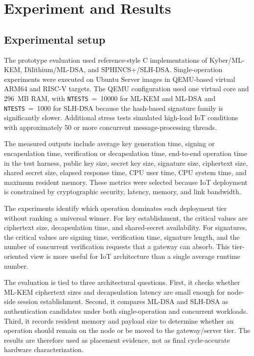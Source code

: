 \documentclass[conference,10pt,letterpaper]{IEEEtran}
\begin{document}
\section{Experiment and Results}

\subsection{Experimental setup}

The prototype evaluation used reference-style C implementations of Kyber/ML-KEM, Dilithium/ML-DSA, and SPHINCS+/SLH-DSA. Single-operation experiments were executed on Ubuntu Server images in QEMU-based virtual ARM64 and RISC-V targets. The QEMU configuration used one virtual core and 296~MB RAM, with \texttt{NTESTS}~=~10000 for ML-KEM and ML-DSA and \texttt{NTESTS}~=~1000 for SLH-DSA because the hash-based signature family is significantly slower. Additional stress tests simulated high-load IoT conditions with approximately 50 or more concurrent message-processing threads.

The measured outputs include average key generation time, signing or encapsulation time, verification or decapsulation time, end-to-end operation time in the test harness, public key size, secret key size, signature size, ciphertext size, shared secret size, elapsed response time, CPU user time, CPU system time, and maximum resident memory. These metrics were selected because IoT deployment is constrained by cryptographic security, latency, memory, and link bandwidth.

The experiments identify which operation dominates each deployment tier without ranking a universal winner. For key establishment, the critical values are ciphertext size, decapsulation time, and shared-secret availability. For signatures, the critical values are signing time, verification time, signature length, and the number of concurrent verification requests that a gateway can absorb. This tier-oriented view is more useful for IoT architecture than a single average runtime number.

The evaluation is tied to three architectural questions. First, it checks whether ML-KEM ciphertext sizes and decapsulation latency are small enough for node-side session establishment. Second, it compares ML-DSA and SLH-DSA as authentication candidates under both single-operation and concurrent workloads. Third, it records resident memory and payload size to determine whether an operation should remain on the node or be moved to the gateway/server tier. The results are therefore used as placement evidence, not as final cycle-accurate hardware characterization.
\end{document}
